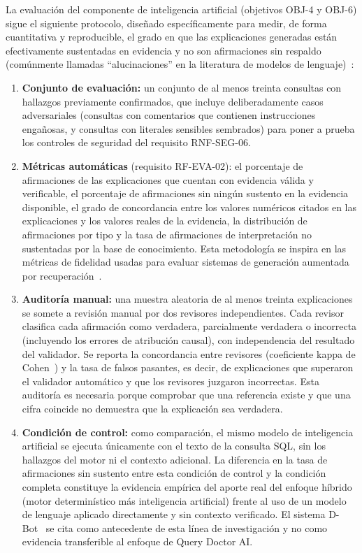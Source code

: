 \documentclass[11pt,a4paper]{report}
\begin{document}
La evaluaci\'on del componente de inteligencia artificial (objetivos OBJ-4 y OBJ-6) sigue el siguiente protocolo, dise\~nado espec\'ificamente para medir, de forma cuantitativa y reproducible, el grado en que las explicaciones generadas est\'an efectivamente sustentadas en evidencia y no son afirmaciones sin respaldo (com\'unmente llamadas \textquotedblleft alucinaciones\textquotedblright{} en la literatura de modelos de lenguaje)~\cite{R18}:

\begin{enumerate}
\item \textbf{Conjunto de evaluaci\'on:} un conjunto de al menos treinta consultas con hallazgos previamente confirmados, que incluye deliberadamente casos adversariales (consultas con comentarios que contienen instrucciones enga\~nosas, y consultas con literales sensibles sembrados) para poner a prueba los controles de seguridad del requisito RNF-SEG-06.
\item \textbf{M\'etricas autom\'aticas} (requisito RF-EVA-02): el porcentaje de afirmaciones de las explicaciones que cuentan con evidencia v\'alida y verificable, el porcentaje de afirmaciones sin ning\'un sustento en la evidencia disponible, el grado de concordancia entre los valores num\'ericos citados en las explicaciones y los valores reales de la evidencia, la distribuci\'on de afirmaciones por tipo y la tasa de afirmaciones de interpretaci\'on no sustentadas por la base de conocimiento. Esta metodolog\'ia se inspira en las m\'etricas de fidelidad usadas para evaluar sistemas de generaci\'on aumentada por recuperaci\'on~\cite{R17}.
\item \textbf{Auditor\'ia manual:} una muestra aleatoria de al menos treinta explicaciones se somete a revisi\'on manual por dos revisores independientes. Cada revisor clasifica cada afirmaci\'on como verdadera, parcialmente verdadera o incorrecta (incluyendo los errores de atribuci\'on causal), con independencia del resultado del validador. Se reporta la concordancia entre revisores (coeficiente kappa de Cohen~\cite{R31}) y la tasa de falsos pasantes, es decir, de explicaciones que superaron el validador autom\'atico y que los revisores juzgaron incorrectas. Esta auditor\'ia es necesaria porque comprobar que una referencia existe y que una cifra coincide no demuestra que la explicaci\'on sea verdadera.
\item \textbf{Condici\'on de control:} como comparaci\'on, el mismo modelo de inteligencia artificial se ejecuta \'unicamente con el texto de la consulta SQL, sin los hallazgos del motor ni el contexto adicional. La diferencia en la tasa de afirmaciones sin sustento entre esta condici\'on de control y la condici\'on completa constituye la evidencia emp\'irica del aporte real del enfoque h\'ibrido (motor determin\'istico m\'as inteligencia artificial) frente al uso de un modelo de lenguaje aplicado directamente y sin contexto verificado. El sistema D-Bot~\cite{R19} se cita como antecedente de esta l\'inea de investigaci\'on y no como evidencia transferible al enfoque de Query Doctor AI.

\end{enumerate}
\end{document}
